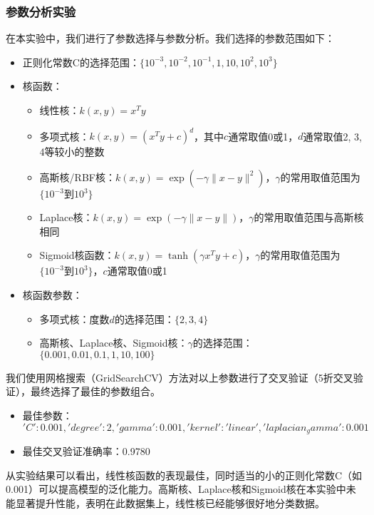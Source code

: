 \documentclass[12pt]{article}
\begin{document}
\subsubsection{参数分析实验}

在本实验中，我们进行了参数选择与参数分析。我们选择的参数范围如下：

\begin{itemize}
  \item 正则化常数C的选择范围：\(\{10^{-3}, 10^{-2}, 10^{-1}, 1, 10, 10^2, 10^3\}\)
  \item 核函数：
        \begin{itemize}
          \item 线性核：\(k(x,y) = x^T y\)
          \item 多项式核：\(k(x,y) = (x^T y + c)^d\)，其中\(c\)通常取值0或1，\(d\)通常取值2, 3, 4等较小的整数
          \item 高斯核/RBF核：\(k(x,y) = \exp(-\gamma \|x - y\|^2)\)，\(\gamma\)的常用取值范围为\(\{10^{-3}到10^3\}\)
          \item Laplace核：\(k(x,y) = \exp(-\gamma \|x - y\|)\)，\(\gamma\)的常用取值范围与高斯核相同
          \item Sigmoid核函数：\(k(x,y) = \tanh(\gamma x^T y + c)\)，\(\gamma\)的常用取值范围为\(\{10^{-3}到10^3\}\)，\(c\)通常取值0或1
        \end{itemize}
  \item 核函数参数：
        \begin{itemize}
          \item 多项式核：度数\(d\)的选择范围：\(\{2, 3, 4\}\)
          \item 高斯核、Laplace核、Sigmoid核：\(\gamma\)的选择范围：\(\{0.001, 0.01, 0.1, 1, 10, 100\}\)
        \end{itemize}
\end{itemize}

我们使用网格搜索（GridSearchCV）方法对以上参数进行了交叉验证（5折交叉验证），最终选择了最佳的参数组合。

\begin{itemize}
  \item 最佳参数：\('C': 0.001, 'degree': 2, 'gamma': 0.001, 'kernel': 'linear', 'laplacian_gamma': 0.001\)
  \item 最佳交叉验证准确率：0.9780
\end{itemize}

从实验结果可以看出，线性核函数的表现最佳，同时适当的小的正则化常数C（如0.001）可以提高模型的泛化能力。高斯核、Laplace核和Sigmoid核在本实验中未能显著提升性能，表明在此数据集上，线性核已经能够很好地分类数据。
\end{document}
